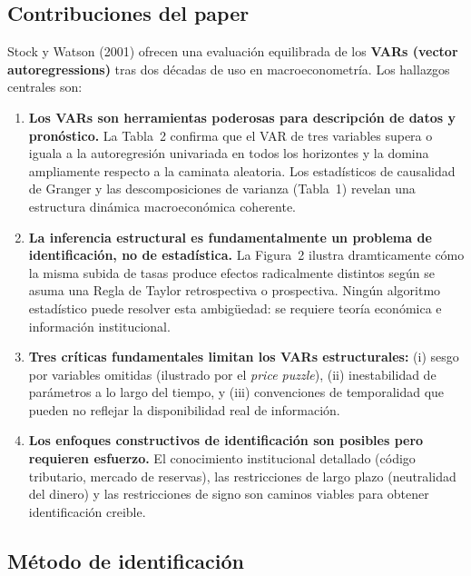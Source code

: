 \documentclass[12pt]{article}
\begin{document}
\subsection{Contribuciones del paper}

Stock y Watson (2001) ofrecen una evaluaci\'on equilibrada de los \textbf{VARs (vector autoregressions)} tras dos d\'ecadas de uso en macroeconometr\'ia. Los hallazgos centrales son:

\begin{enumerate}
  \item \textbf{Los VARs son herramientas poderosas para descripci\'on de datos y pron\'ostico.} La Tabla~2 confirma que el VAR de tres variables supera o iguala a la autoregresi\'on univariada en todos los horizontes y la domina ampliamente respecto a la caminata aleatoria. Los estad\'isticos de causalidad de Granger y las descomposiciones de varianza (Tabla~1) revelan una estructura din\'amica macroecon\'omica coherente.

  \item \textbf{La inferencia estructural es fundamentalmente un problema de identificaci\'on, no de estad\'istica.} La Figura~2 ilustra dramticamente c\'omo la misma subida de tasas produce efectos radicalmente distintos seg\'un se asuma una Regla de Taylor retrospectiva o prospectiva. Ning\'un algoritmo estad\'istico puede resolver esta ambig\"uedad: se requiere teor\'ia econ\'omica e informaci\'on institucional.

  \item \textbf{Tres cr\'iticas fundamentales limitan los VARs estructurales:} (i) sesgo por variables omitidas (ilustrado por el \textit{price puzzle}), (ii) inestabilidad de par\'ametros a lo largo del tiempo, y (iii) convenciones de temporalidad que pueden no reflejar la disponibilidad real de informaci\'on.

  \item \textbf{Los enfoques constructivos de identificaci\'on son posibles pero requieren esfuerzo.} El conocimiento institucional detallado (c\'odigo tributario, mercado de reservas), las restricciones de largo plazo (neutralidad del dinero) y las restricciones de signo son caminos viables para obtener identificaci\'on creible.
\end{enumerate}

\subsection{M\'etodo de identificaci\'on}
\end{document}
